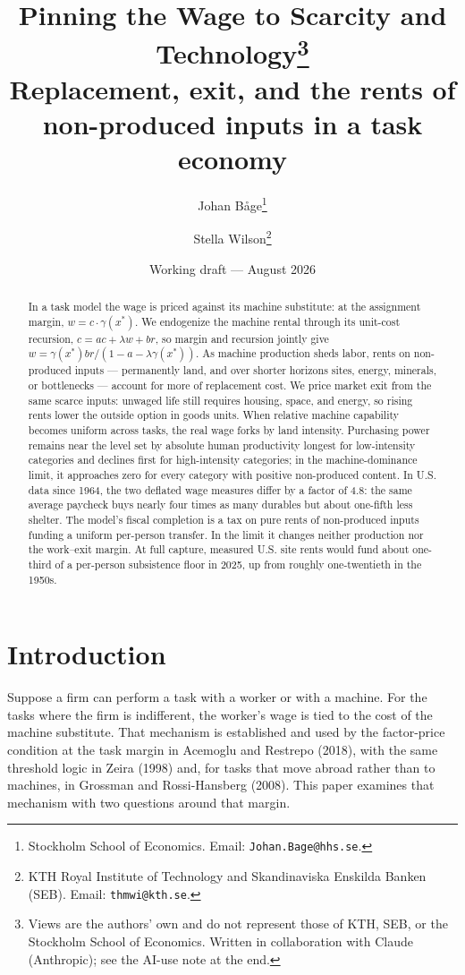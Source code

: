 \documentclass[12pt]{article}
\title{\bfseries Pinning the Wage to Scarcity and Technology\thanks{Views are the
  authors' own and do not represent those of KTH, SEB, or the Stockholm School of
  Economics. Written in collaboration with Claude (Anthropic); see the AI-use note
  at the end.
  }\\[7pt]
  \large\mdseries Replacement, exit, and the rents of non-produced inputs in a task economy}
\author{
  Johan B\r{a}ge\thanks{Stockholm School of Economics.
    Email: \texttt{Johan.Bage@hhs.se}.
  }
  \and
  Stella Wilson\thanks{KTH Royal Institute of Technology and Skandinaviska
    Enskilda Banken (SEB). Email: \texttt{thmwi@kth.se}.}
}
\date{Working draft --- August 2026}
\theoremstyle{plain}
\begin{document}
\maketitle

\begin{abstract}
\noindent In a task model the wage is priced against its machine substitute: at the assignment margin, $w=c\cdot\gamma(x^*)$. We endogenize the machine rental through its unit-cost recursion, $c=ac+\lambda w+br$, so margin and recursion jointly give $w=\gamma(x^*)br/(1-a-\lambda\gamma(x^*))$. As machine production sheds labor, rents on non-produced inputs --- permanently land, and over shorter horizons sites, energy, minerals, or bottlenecks --- account for more of replacement cost. We price market exit from the same scarce inputs: unwaged life still requires housing, space, and energy, so rising rents lower the outside option in goods units. When relative machine capability becomes uniform across tasks, the real wage forks by land intensity. Purchasing power remains near the level set by absolute human productivity longest for low-intensity categories and declines first for high-intensity categories; in the machine-dominance limit, it approaches zero for every category with positive non-produced content. In U.S. data since 1964, the two deflated wage measures differ by a factor of 4.8: the same average paycheck buys nearly four times as many durables but about one-fifth less shelter. The model's fiscal completion is a tax on pure rents of non-produced inputs funding a uniform per-person transfer. In the limit it changes neither production nor the work--exit margin. At full capture, measured U.S. site rents would fund about one-third of a per-person subsistence floor in 2025, up from roughly one-twentieth in the 1950s.
\end{abstract}

\section{Introduction}\label{sec:intro}

Suppose a firm can perform a task with a worker or with a machine. For the tasks where the firm is indifferent, the worker's wage is tied to the cost of the machine substitute. That mechanism is established and used by the factor-price condition at the task margin in Acemoglu and Restrepo (2018), with the same threshold logic in Zeira (1998) and, for tasks that move abroad rather than to machines, in Grossman and Rossi-Hansberg (2008). This paper examines that mechanism with two questions around that margin.
\end{document}
